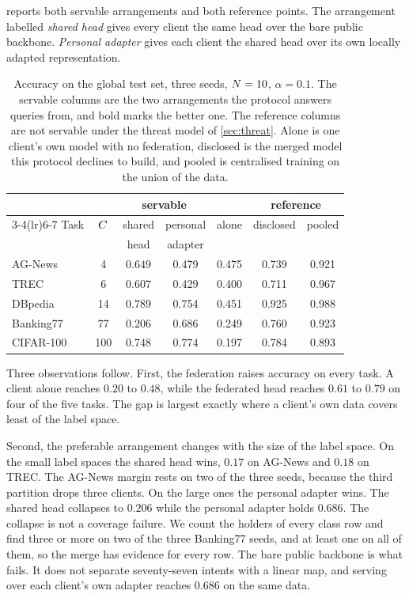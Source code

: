  reports both servable arrangements and both reference points.
The arrangement labelled \emph{shared head} gives every client the same head over
the bare public backbone. \emph{Personal adapter} gives
each client the shared head over its own locally adapted representation.

\begin{table}[t]
\centering
\caption{Accuracy on the global test set, three seeds, $N=10$, $\alpha=0.1$.
The servable columns are the two arrangements the protocol answers queries from,
and bold marks the better one. The reference columns are not servable under the
threat model of \cref{sec:threat}. Alone is one client's own model with no
federation, disclosed is the merged model this protocol declines to build, and
pooled is centralised training on the union of the data.}
\label{tab:headline}
\footnotesize
\setlength{\tabcolsep}{4pt}
\begin{tabular}{lcccccc}
\toprule
 & & \multicolumn{2}{c}{servable} & & \multicolumn{2}{c}{reference} \\
\cmidrule(lr){3-4}\cmidrule(lr){6-7}
Task & $C$ & shared & personal & alone & disclosed & pooled \\
 & & head & adapter & & & \\
\midrule
AG-News    & 4   & $\mathbf{0.649}$ & 0.479 & 0.475 & 0.739 & 0.921 \\
TREC       & 6   & $\mathbf{0.607}$ & 0.429 & 0.400 & 0.711 & 0.967 \\
DBpedia    & 14  & $\mathbf{0.789}$ & 0.754 & 0.451 & 0.925 & 0.988 \\
Banking77  & 77  & 0.206 & $\mathbf{0.686}$ & 0.249 & 0.760 & 0.923 \\
CIFAR-100  & 100 & 0.748 & $\mathbf{0.774}$ & 0.197 & 0.784 & 0.893 \\
\bottomrule
\end{tabular}
\end{table}

Three observations follow. First, the federation raises accuracy on every task. A client alone
reaches $0.20$ to $0.48$, while the federated head reaches $0.61$ to $0.79$ on
four of the five tasks. The gap is largest exactly where a client's own data covers
least of the label space.

Second, the preferable arrangement changes with the size of the label space. On the small label spaces the shared head wins, $0.17$ on AG-News and $0.18$ on TREC.
The AG-News margin rests on two of the three seeds, because the third partition
drops three clients. On the large ones the personal
adapter wins. The shared head collapses to
$0.206$ while the personal adapter holds $0.686$. The collapse is not a coverage
failure. We count the holders of every class row and find three or more on two of
the three Banking77 seeds, and at least one on all of them, so the merge has
evidence for every row. The bare public backbone is what fails. It does not
separate seventy-seven intents with a linear map, and serving over each client's
own adapter reaches $0.686$ on the same data.

